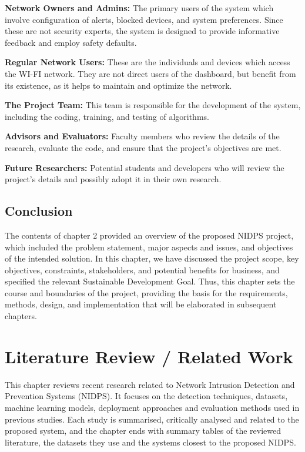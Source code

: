 \noindent \textbf{Network Owners and Admins:} The primary users of the system which involve configuration of alerts, blocked devices, and system preferences. Since these are not security experts, the system is designed to provide informative feedback and employ safety defaults.

\noindent \textbf{Regular Network Users:} These are the individuals and devices which access the WI-FI network. They are not direct users of the dashboard, but benefit from its existence, as it helps to maintain and optimize the network.

\noindent \textbf{The Project Team:} This team is responsible for the development of the system, including the coding, training, and testing of algorithms.

\noindent \textbf{Advisors and Evaluators:} Faculty members who review the details of the research, evaluate the code, and ensure that the project's objectives are met.

\noindent \textbf{Future Researchers:} Potential students and developers who will review the project's details and possibly adopt it in their own research.

\section{Conclusion}\label{sec:2.10}

\noindent The contents of chapter 2 provided an overview of the proposed NIDPS project, which included the problem statement, major aspects and issues, and objectives of the intended solution. In this chapter, we have discussed the project scope, key objectives, constraints, stakeholders, and potential benefits for business, and specified the relevant Sustainable Development Goal. Thus, this chapter sets the course and boundaries of the project, providing the basis for the requirements, methods, design, and implementation that will be elaborated in subsequent chapters.

\chapter{Literature Review / Related Work}\label{chap:3}

\noindent This chapter reviews recent research related to Network Intrusion Detection and Prevention Systems (NIDPS). It focuses on the detection techniques, datasets, machine learning models, deployment approaches and evaluation methods used in previous studies. Each study is summarised, critically analysed and related to the proposed system, and the chapter ends with summary tables of the reviewed literature, the datasets they use and the systems closest to the proposed NIDPS.

